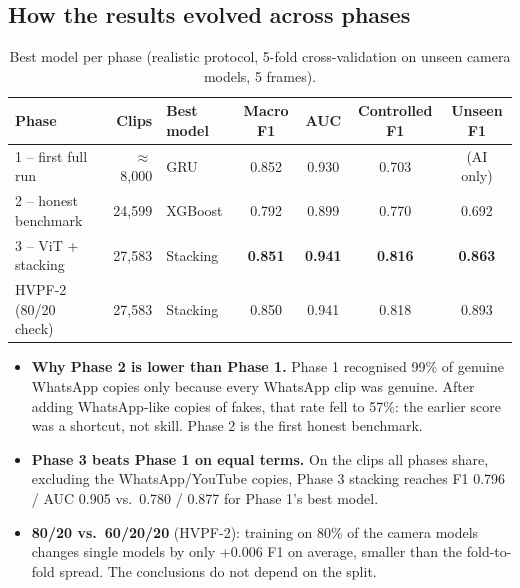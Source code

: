 \documentclass[11pt,a4paper]{article}
\begin{document}
\subsection{How the results evolved across phases}
\begin{table}[H]\centering\small
\setlength{\tabcolsep}{4.5pt}\begin{tabular}{lrlcccc}\toprule
Phase & Clips & Best model & Macro F1 & AUC & Controlled F1 & Unseen F1 \\\midrule
1 -- first full run & $\approx$8,000 & GRU & 0.852 & 0.930 & 0.703 & (AI only) \\
2 -- honest benchmark & 24,599 & XGBoost & 0.792 & 0.899 & 0.770 & 0.692 \\
3 -- ViT + stacking & 27,583 & Stacking & \textbf{0.851} & \textbf{0.941} & \textbf{0.816} & \textbf{0.863} \\
HVPF-2 (80/20 check) & 27,583 & Stacking & 0.850 & 0.941 & 0.818 & 0.893 \\\bottomrule
\end{tabular}\caption{Best model per phase (realistic protocol, 5-fold cross-validation on unseen camera models, 5 frames).}
\label{tab:phases}\end{table}
\begin{itemize}
\item \textbf{Why Phase 2 is lower than Phase 1.} Phase 1 recognised 99\% of genuine WhatsApp copies only because every
      WhatsApp clip was genuine. After adding WhatsApp-like copies of fakes, that rate fell to 57\%: the earlier score was a
      shortcut, not skill. Phase 2 is the first honest benchmark.
\item \textbf{Phase 3 beats Phase 1 on equal terms.} On the clips all phases share, excluding the WhatsApp/YouTube copies,
      Phase 3 stacking reaches F1 0.796 / AUC 0.905 vs.\ 0.780 / 0.877 for Phase 1's best model.
\item \textbf{80/20 vs.\ 60/20/20} (HVPF-2): training on 80\% of the camera models changes single models by only +0.006 F1
      on average, smaller than the fold-to-fold spread. The conclusions do not depend on the split.
\end{itemize}
\end{document}
